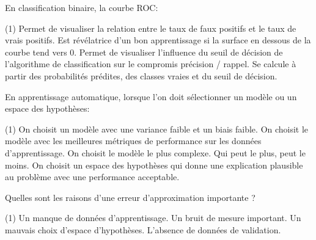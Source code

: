 \documentclass[solutions]{../cc}
\begin{document}
		\begin{question}
			En classification binaire, la courbe ROC:
			\begin{tasks}(1)
				\task Permet de visualiser la relation entre le taux de faux positifs et le taux de vrais positifs.
				\task Est révélatrice d'un bon apprentissage si la surface en dessous de la courbe tend vers 0.
				\task Permet de visualiser l'influence du seuil de décision de l'algorithme de classification sur le compromis précision / rappel.
				\task Se calcule à partir des probabilités prédites, des classes vraies et du seuil de décision.
			\end{tasks}
		\end{question}

		\begin{question}
			En apprentissage automatique, lorsque l'on doit sélectionner un modèle ou un espace des hypothèses:
			\begin{tasks}(1)
				\task On choisit un modèle avec une variance faible et un biais faible.
				\task On choisit le modèle avec les meilleures métriques de performance sur les données d'apprentissage.
				\task On choisit le modèle le plus complexe. Qui peut le plus, peut le moins.
				\task On choisit un espace des hypothèses qui donne une explication plausible au problème avec une performance acceptable.
			\end{tasks}
		\end{question}

		\begin{question}
			Quelles sont les raisons d'une erreur d'approximation importante ?
			\begin{tasks}(1)
				\task Un manque de données d'apprentissage.
				\task Un bruit de mesure important.
				\task Un mauvais choix d'espace d'hypothèses.
				\task L'absence de données de validation.
			\end{tasks}
		\end{question}
	
\end{document}
